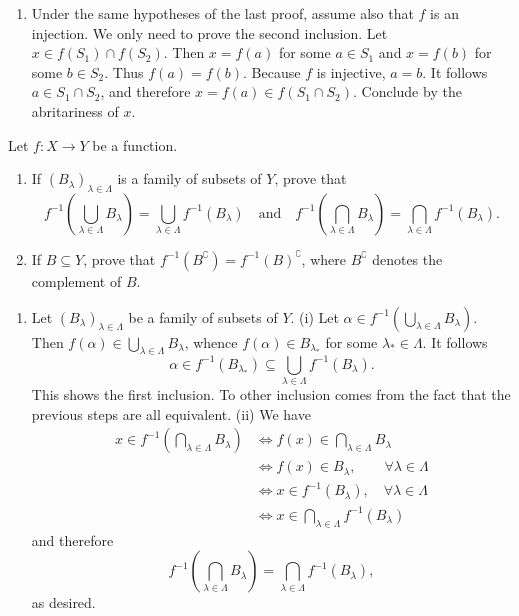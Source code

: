 \begin{questions}
\begin{theproof}
\begin{enumerate}[label=(\alph*)]
    \item Under the same hypotheses of the last proof, assume also that \(f\) is an injection. 
    We only need to prove the second inclusion. 
    Let \(x\in f\left(S_1\right) \cap f\left(S_2\right)\). Then \(x= f(a)\) for some \(a\in S_1\) and  \(x= f(b)\) for some \(b\in S_2\). Thus \(f(a) = f(b)\). Because \(f\) is injective, \(a=b\). 
    It follows \(a\in S_1\cap S_2\), and therefore \(x=f(a)\in f(S_1\cap S_2)\). Conclude by the abritariness of \(x\).
\end{enumerate}    
\end{theproof}


\question
    Let \(f: X \rightarrow Y\) be a function.
    \begin{enumerate}[label=(\alph*)]
        \item If \((B_\lambda)_{\lambda\in \Lambda} \) is a family of subsets of \(Y\), prove that
\[
f^{-1}\left(\bigcup_{\lambda\in\Lambda} B_{\lambda}\right)=\bigcup_{\lambda\in\Lambda} f^{-1}\left(B_\lambda\right) \quad\text{and}\quad f^{-1}\left(\bigcap_{\lambda\in\Lambda} B_\lambda\right)=\bigcap_{\lambda\in\Lambda} f^{-1}\left(B_{\lambda}\right).
\]
        \item If \(B \subseteq Y\), prove that \(f^{-1}\left(B^{\complement}\right)=f^{-1}(B)^{\complement}\), where \(B^{\complement}\) denotes the complement of \(B\).
    \end{enumerate}

\begin{theproof}
\begin{enumerate}[label=(\alph*)]
    \item  Let \((B_\lambda)_{\lambda\in \Lambda} \) be a family of subsets of \(Y\). 
    (i) Let \(\alpha\in f^{-1}\left(\bigcup_{\lambda\in\Lambda} B_{\lambda}\right)\).
    Then \(f(\alpha)\in \bigcup_{\lambda\in\Lambda} B_{\lambda}\), whence \(f(\alpha) \in B_{\lambda_*}\) for some \(\lambda_*\in \Lambda\).
    It follows 
    \[\alpha \in f^{-1} (B_{\lambda_*})\subseteq \bigcup_{\lambda\in\Lambda} f^{-1}\left(B_\lambda\right).\]
    This shows the first inclusion.
    To other inclusion comes from the fact that the previous steps are all equivalent.
    (ii) We have 
    \begin{align*}
        x \in f^{-1} \left(\bigcap\limits_{\lambda\in\Lambda} B_\lambda\right) & \iff f(x) \in \bigcap\limits_{\lambda\in\Lambda} B_\lambda \\
        & \iff f(x) \in B_\lambda, \qquad \forall \lambda \in \Lambda \\
        & \iff x \in f^{-1} (B_\lambda), \quad \forall \lambda \in \Lambda \\
        & \iff x \in \bigcap\limits_{\lambda\in\Lambda } f^{-1} (B_\lambda)
    \end{align*} and therefore
    \[
        f^{-1}\left(\bigcap_{\lambda\in\Lambda} B_\lambda\right)=\bigcap_{\lambda\in\Lambda} f^{-1}\left(B_{\lambda}\right),
    \]
    as desired.
        

\end{enumerate}
\end{theproof}
\end{questions}
